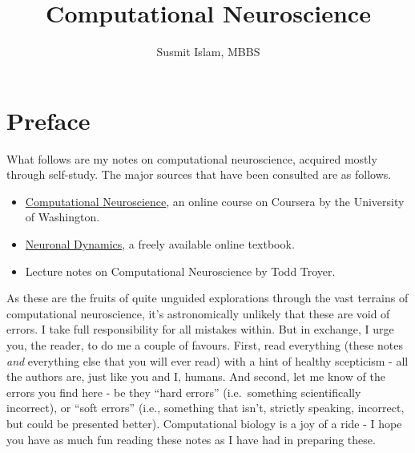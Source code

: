 \documentclass[
  12pt,
]{memoir}
\title{Computational Neuroscience}
\author{Susmit Islam, MBBS}
\date{}
\providecommand{\tightlist}{%
  \setlength{\itemsep}{0pt}\setlength{\parskip}{0pt}}
\begin{document}
\frontmatter

\maketitle

\mainmatter
\renewcommand{\labelitemi}{$\blacktriangleright$}
\renewcommand{\labelitemii}{$\boldsymbol\circ$}
\renewcommand{\labelitemiii}{$\bullet$}
\renewcommand{\labelitemiv}{\tiny$\blacksquare$}

\openany
\raggedbottom
\twocoltocetc
\tableofcontents

\pagebreak

\hypertarget{preface}{%
\chapter*{Preface}\label{preface}}

What follows are my notes on computational neuroscience, acquired mostly
through self-study. The major sources that have been consulted are as
follows.

\begin{itemize}
    \tightlist
    \item \href{https://www.coursera.org/learn/computational-neuroscience}{Computational Neuroscience}, an online course on Coursera by the University of Washington.
    \item \href{https://neuronaldynamics.epfl.ch/online/}{Neuronal Dynamics}, a freely available online textbook.
    \item Lecture notes on Computational Neuroscience by Todd Troyer.
\end{itemize}

As these are the fruits of quite unguided explorations through the vast
terrains of computational neuroscience, it's astronomically unlikely
that these are void of errors. I take full responsibility for all
mistakes within. But in exchange, I urge you, the reader, to do me a
couple of favours. First, read everything (these notes \emph{and}
everything else that you will ever read) with a hint of healthy
scepticism - all the authors are, just like you and I, humans. And
second, let me know of the errors you find here - be they ``hard
errors'' (i.e.~something scientifically incorrect), or ``soft errors''
(i.e., something that isn't, strictly speaking, incorrect, but could be
presented better). Computational biology is a joy of a ride - I hope you
have as much fun reading these notes as I have had in preparing these.
\end{document}
